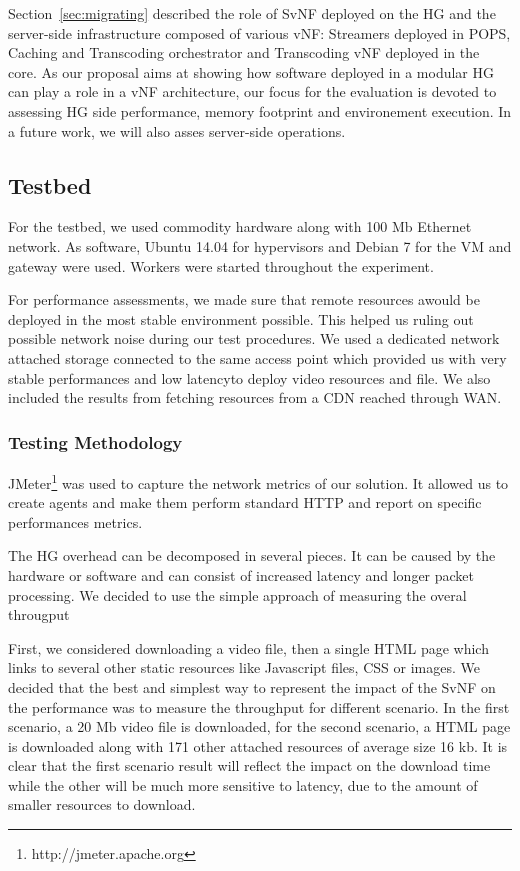 Section~\ref{sec:migrating} described the role of SvNF deployed on the HG and the server-side infrastructure composed of various vNF: Streamers deployed in POPS, Caching and Transcoding orchestrator and Transcoding vNF deployed in the core.
As our proposal aims at showing how software deployed in a modular HG can play a role in a vNF architecture, our focus for the evaluation is devoted to assessing HG side performance, memory footprint and environement execution. In a future work, we will also asses server-side operations.


\subsection{Testbed}

For the testbed, we used commodity hardware along with 100 Mb Ethernet network. As software, Ubuntu 14.04 for hypervisors and Debian 7 for the VM and gateway were used. Workers were started throughout the experiment.
  
For performance assessments, we made sure that remote resources awould be deployed in the most stable environment possible. This helped us ruling out possible network noise during our test procedures. We used a dedicated network attached storage connected to the same access point which provided us with very stable performances and low latencyto deploy video resources and file. We also included the results from fetching resources from a CDN reached through WAN.

 \subsubsection{Testing Methodology}
JMeter\footnote{http://jmeter.apache.org} was used to capture the network metrics of our solution.
It allowed us to create agents and make them perform standard HTTP and report on specific performances metrics.    

The HG overhead can be decomposed in several pieces.
It can be caused by the hardware or software and can consist of increased latency and longer packet processing.
We decided to use the simple approach of measuring the overal througput 

First, we considered downloading a video file, then a single HTML page which links to several other static resources like Javascript files, CSS or images. 
We decided that the best and simplest way to represent the impact of the SvNF on the performance was to measure the throughput for different scenario. In the first scenario, a 20 Mb video file is downloaded, for the second scenario, a HTML page is downloaded along with 171 other attached resources of average size 16 kb. It is clear that the first scenario result will reflect the impact on the download time while the other will be much more sensitive to latency, due to the amount of smaller resources to download.


